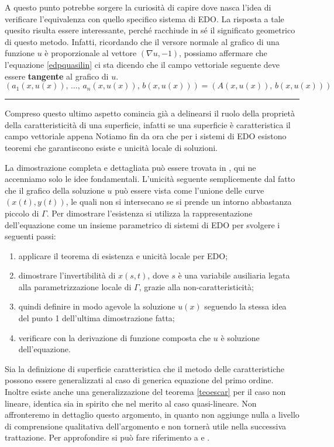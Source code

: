 A questo punto potrebbe sorgere la curiosità di capire dove nasca l'idea di verificare l'equivalenza con quello specifico sistema di EDO. La risposta a tale quesito risulta essere interessante, perché racchiude in sé il significato geometrico di questo metodo. Infatti, ricordando che il versore normale al grafico di una funzione $u$ è proporzionale al vettore $(\nabla u , -1)$, possiamo affermare che l'equazione \eqref{edpquasilin} ci sta dicendo che il campo vettoriale seguente deve essere  \textbf{tangente} al grafico di $u$.
$$(a_1(x,u(x)),\, \ldots ,\, a_n(x,u(x)),\, b(x,u(x)))=(A(x,u(x)),\, b(x,u(x)))$$

\noindent\rule[0.5ex]{\linewidth}{0.2pt}

Compreso questo ultimo aspetto comincia già a delinearsi il ruolo della proprietà della caratteristicità di una superficie, infatti se una superficie è caratteristica il campo vettoriale appena 
Notiamo fin da ora che per i sistemi di EDO esistono teoremi che garantiscono esiste e unicità locale di soluzioni.
\begin{theorem}\label{teoescar}
\end{theorem}
La dimostrazione completa e dettagliata può essere trovata in \cite[cap.1]{Folland}, qui ne accenniamo solo le idee fondamentali. L'unicità seguente semplicemente dal fatto che il grafico della soluzione $u$ può essere vista come l'unione delle curve $(x(t),y(t))$, le quali non si intersecano se si prende un intorno abbastanza piccolo di $\Gamma$. Per dimostrare l'esistenza si utilizza la rappresentazione dell'equazione come un insieme parametrico di sistemi di EDO per svolgere i seguenti passi:
\begin{enumerate}
\item applicare il teorema di esistenza e unicità locale per EDO;
\item dimostrare l'invertibilità di $x(s,t)$, dove $s$ è una variabile ausiliaria legata alla parametrizzazione locale di $\Gamma$, grazie alla non-caratteristicità;
\item quindi definire in modo agevole la soluzione $u(x)$ seguendo la stessa idea del punto 1 dell'ultima dimostrazione fatta;
\item verificare con la derivazione di funzione composta che $u$ è soluzione dell'equazione.
\end{enumerate}
Sia la definizione di superficie caratteristica che il metodo delle caratteristiche possono essere generalizzati al caso di generica equazione del primo ordine. Inoltre esiste anche una generalizzazione del teorema \ref{teoescar} per il caso non lineare, identica sia in spirito che nel merito al caso quasi-lineare.
Non affronteremo in dettaglio questo argomento, in quanto non aggiunge nulla a livello di comprensione qualitativa dell'argomento e non tornerà utile nella successiva trattazione. Per approfondire si può fare riferimento a \cite[cap.1]{Folland} e \cite[cap.3]{Evans}.

